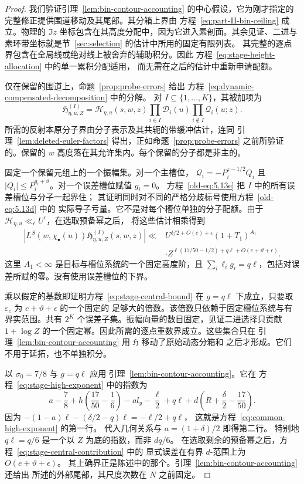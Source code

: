 \documentclass[11pt,a4paper]{article}
\numberwithin{equation}{section}
\numberwithin{figure}{section}
\theoremstyle{definition}
\theoremstyle{remark}
\begin{document}
\begin{proof}
我们验证引理~\ref{lem:bin-contour-accounting} 的中心假设，它为刚才指定的
完整修正提供围道移动及其尾部。其分箱上界由
方程~\eqref{eq:part-II-bin-ceiling} 成立。物理的
\(\Im z\) 坐标包含在其高度分配中，因为它进入素剖面。其余见证、二进与
素环带坐标就是节~\ref{sec:selection} 的估计中所用的固定有限列表。
其完整的逐点界包含在全局线或绝对线上被舍弃的辅助积分。因此
方程~\eqref{eq:stage-height-allocation} 中的单一累积分配适用，
而无需在之后的估计中重新申请配额。

仅在保留的围道上，命题~\ref{prop:probe-errors} 给出
方程~\eqref{eq:dynamic-compensated-decomposition} 中的分解。
对 \(I\subseteq\{1,\ldots,K\}\)，其被加项为
\[
 \mathfrak H_{\eta,u,Z}^{(I)}
 =\mathcal H_{\eta,u}(s,w,z)
       \prod_{i\in I}\mathcal D_i(u)
       \prod_{i\notin I}\mathcal Q_i(u;z).
\]
所需的反射本原分子界由分子表示及其共轭的带缓冲估计，连同
引理~\ref{lem:deleted-euler-factors} 得出，正如命题~\ref{prop:probe-errors}
之前所验证的。保留的 \(w\) 高度落在其允许集内。每个保留的分子都是非主的。

固定一个保留元组上的一个振幅集。对一个主槽位，
\(\mathcal Q_i=-P_i^{z-1/2}Q_i\) 且
\(\lvert Q_i\rvert\le P_i^{g_i+\vartheta}\)。对一个误差槽位赋值 \(g_i=0\)。
方程~\eqref{old-eq:5.13e} 把 \(I\) 中的所有误差槽位与分子一起界住；
其证明同时对不同的严格分歧标号使用方程~\eqref{old-eq:5.13d} 中的
实际导子亏量。它不是对每个槽位单独的分子配额。由于
\(\mathcal H_{\eta,u}\ll_\epsilon U^\epsilon\)，在选取预备幂之后，
将这些估计相乘得到
\[
 \begin{split}
 \left|L^S(w,\chi_\bullet(u))
       \mathfrak H_{\eta,u,Z}^{(I)}(s,w,z)\right|
 \ll{}&U^{\delta/2+O(e)+\epsilon}(1+T_1)^{A_1}\\
 &\cdot
 Z^{\ell(17/50-1/2)+q\ell+O(e+\vartheta+\epsilon)}.
 \end{split}
\]
这里 \(A_1<\infty\) 是目标与槽位系统的一个固定高度阶，且
\(\sum_i\ell_i g_i=q\ell\)，包括对误差所赋的零。没有使用误差槽位的下界。

乘以假定的基数即证明方程~\eqref{eq:stage-central-bound} 在 \(g=q\ell\)
下成立，只要取 \(\varepsilon_c\) 为 \(e+\vartheta+\epsilon\) 的一个固定的
足够大的倍数。该倍数只依赖于固定槽位系统与有界实范围。共有 \(2^K\)
个误差子集。振幅向量的数目固定，见证二进选择只贡献 \(1+\log Z\)
的一个固定幂。因此所需的逐点重数界成立。这些集合只在
引理~\ref{lem:bin-contour-accounting} 用 \(\mathfrak H\) 移动了原始动态分箱和
之后才形成。它们不用于延拓，也不单独积分。

以 \(\sigma_0=7/8\) 与 \(g=q\ell\) 应用
引理~\ref{lem:bin-contour-accounting}。它在
方程~\eqref{eq:stage-high-exponent} 中的指数为
\[
 a-\frac78+h\left(\frac{17}{50}-\frac16\right)-a l_y-\frac{\ell}{2}
       +q\ell+d\left(R+\frac\delta2-\frac{17}{50}\right).
\]
因为
\(-(1-a)\ell-(\delta/2-q)\ell=-\ell/2+q\ell\)，
这就是方程~\eqref{eq:common-high-exponent} 的第一行。
代入几何关系与 \(a=(1+\delta)/2\) 即得第二行。
特别地 \(q\ell=q/6\) 是一个以 \(Z\) 为底的指数，而非 \(dq/6\)。
在选取剩余的预备幂之后，方程~\eqref{eq:stage-central-contribution} 中的
显式误差在有界 \(d\)-范围上为 \(O(e+\vartheta+\epsilon)\)。
其上确界正是陈述中的那个。引理~\ref{lem:bin-contour-accounting} 还给出
所述的外部尾部，其尺度次数在 \(N\) 之前固定。
\end{proof}
\end{document}
